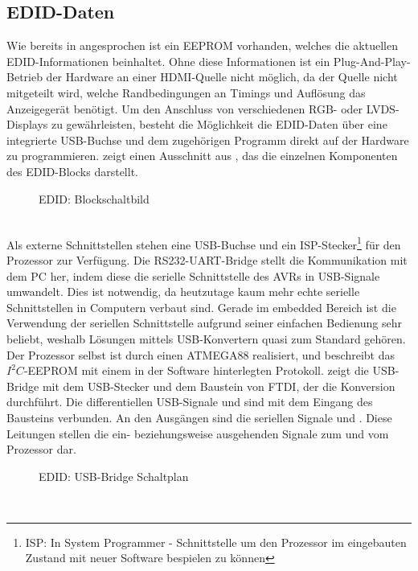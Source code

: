 \subsection{EDID-Daten}
Wie bereits in  angesprochen ist ein EEPROM vorhanden, welches die aktuellen EDID-Informationen beinhaltet. Ohne diese Informationen ist ein Plug-And-Play-Betrieb der Hardware an einer HDMI-Quelle nicht möglich, da der Quelle nicht mitgeteilt wird, welche Randbedingungen an Timings und Auflösung das Anzeigegerät benötigt. Um den Anschluss von verschiedenen RGB- oder LVDS-Displays zu gewährleisten, besteht die Möglichkeit die EDID-Daten über eine integrierte USB-Buchse und dem zugehörigen Programm direkt auf der Hardware zu programmieren.  zeigt einen Ausschnitt aus , das die einzelnen Komponenten des EDID-Blocks darstellt. 
\begin{figure}[htp]
	\center
    \caption{EDID: Blockschaltbild}
    \label{fig:teilb_edid_blockschaltbild}
\end{figure}\\
Als externe Schnittstellen stehen eine USB-Buchse und ein ISP-Stecker\footnote{ISP: In System Programmer - Schnittstelle um den Prozessor im eingebauten Zustand mit neuer Software bespielen zu können} für den Prozessor zur Verfügung. Die RS232-UART-Bridge stellt die Kommunikation mit dem PC her, indem diese die serielle Schnittstelle des AVRs in USB-Signale umwandelt. Dies ist notwendig, da heutzutage kaum mehr echte serielle Schnittstellen in Computern verbaut sind. Gerade im embedded Bereich ist die Verwendung der seriellen Schnittstelle aufgrund seiner einfachen Bedienung sehr beliebt, weshalb Lösungen mittels USB-Konvertern quasi zum Standard gehören. Der Prozessor selbst ist durch einen ATMEGA88 realisiert, und beschreibt das $I^2C$-EEPROM mit einem in der Software hinterlegten Protokoll. 
 zeigt die USB-Bridge mit dem USB-Stecker und dem Baustein  von FTDI, der die Konversion durchführt. Die differentiellen USB-Signale  und  sind mit dem Eingang des Bausteins verbunden. An den Ausgängen sind die seriellen Signale  und . Diese Leitungen stellen die ein- beziehungsweise ausgehenden Signale zum und vom Prozessor dar.
\begin{figure}[htp]
	\center
    \caption{EDID: USB-Bridge Schaltplan}
    \label{fig:teilb_edid_usb_sch}
\end{figure}\\
